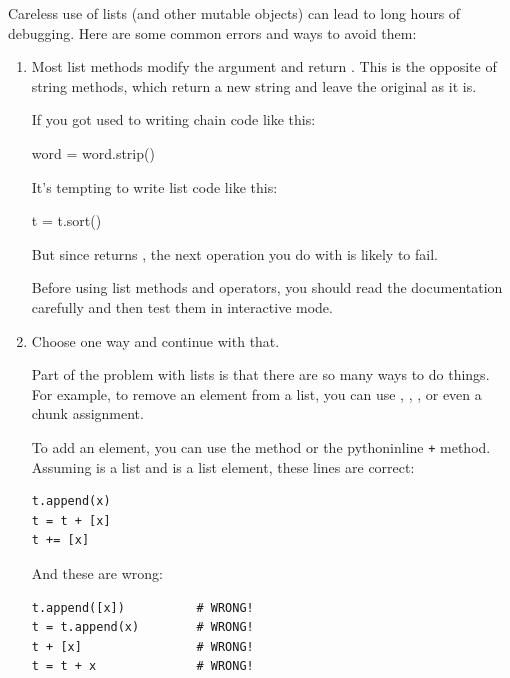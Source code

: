 Careless use of lists (and other mutable objects) can lead to long hours of debugging. Here are some common errors and ways to avoid them:

\begin{enumerate}

\item Most list methods modify the argument and return . This is the opposite of string methods, which return a new string and leave the original as it is.

If you got used to writing chain code like this:

\begin{python}[frame=single]
word = word.strip()
\end{python}

It's tempting to write list code like this:

\begin{python}[frame=single]
t = t.sort()           
\end{python}

But since  returns , the next operation you do with  is likely to fail.

Before using list methods and operators, you should read the documentation carefully and then test them in interactive mode.

\item Choose one way and continue with that.

Part of the problem with lists is that there are so many ways to do things. For example, to remove an element from a list, you can use , , , or even a chunk assignment.

To add an element, you can use the  method or the pythoninline \texttt{+} method. Assuming  is a list and  is a list element, these lines are correct:

\begin{Verbatim}[frame=single]
t.append(x)
t = t + [x]
t += [x]
\end{Verbatim}

And these are wrong:

\begin{Verbatim}[frame=single]
t.append([x])          # WRONG!
t = t.append(x)        # WRONG!
t + [x]                # WRONG!
t = t + x              # WRONG!
\end{Verbatim}


\end{enumerate}
